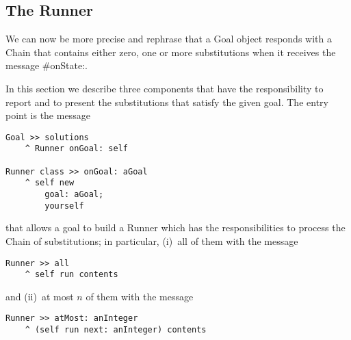 \documentclass[a4paper,11pt]{article}
\newcommand{\ct}[1]{{\textsf{#1}}\xspace}
\begin{document}
\subsection{The Runner}

We can now be more precise and rephrase that a \ct{Goal} object responds with a
\ct{Chain} that contains either zero, one or more substitutions when it
receives the message \ct{\#onState:}.

In this section we describe three components that have the responsibility to
report and to present the substitutions that satisfy the given goal. The entry
point is the message
\begin{verbatim}
Goal >> solutions
    ^ Runner onGoal: self

Runner class >> onGoal: aGoal
    ^ self new
        goal: aGoal;
        yourself
\end{verbatim}
that allows a goal to build a \ct{Runner} which has the responsibilities to
process the \ct{Chain} of substitutions; in particular, (i)~all of them with
the message
\begin{verbatim}
Runner >> all
    ^ self run contents
\end{verbatim}
and (ii)~at most $n$ of them with the message
\begin{verbatim}
Runner >> atMost: anInteger
    ^ (self run next: anInteger) contents
\end{verbatim}
\end{document}
